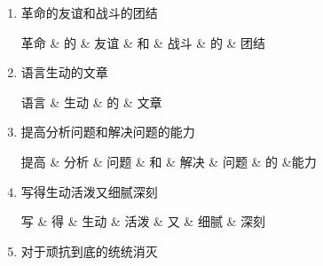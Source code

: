 \begin{enumerate}[label=\textcircled{\arabic*}]
\item 革命的友谊和战斗的团结

\begin{dependency}[theme = simple, edge unit distance=1em]
	\begin{deptext}[column sep=1em]
		革命 \& 的 \& 友谊 \& 和 \& 战斗 \& 的 \& 团结 \\
	\end{deptext}
\end{dependency}
\newpage

\item 语言生动的文章

\begin{dependency}[theme = simple, edge unit distance=0.5em]
	\begin{deptext}[column sep=0.5em]
		语言 \& 生动 \& 的 \& 文章 \\
	\end{deptext}
\end{dependency}

\item 提高分析问题和解决问题的能力

\begin{dependency}[theme = simple, edge unit distance=0.5em]
	\begin{deptext}[column sep=0.5em]
		提高 \& 分析 \& 问题 \& 和 \& 解决 \& 问题 \& 的 \&能力 \\
	\end{deptext}
\end{dependency}

\item 写得生动活泼又细腻深刻

\begin{dependency}[theme = simple, edge unit distance=0.5em]
	\begin{deptext}[column sep=0.5em]
		写 \& 得 \& 生动 \& 活泼 \& 又 \& 细腻 \& 深刻\\
	\end{deptext}
\end{dependency}

\item 对于顽抗到底的统统消灭


\end{enumerate}
